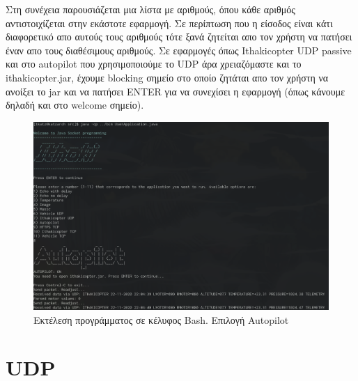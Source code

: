 \documentclass[hidelinks, 12pt, a4paper]{article}
\begin{document}
Στη συνέχεια παρουσιάζεται μια λίστα με αριθμούς, όπου κάθε αριθμός αντιστοιχίζεται στην εκάστοτε εφαρμογή. Σε περίπτωση που η είσοδος είναι κάτι διαφορετικό απο αυτούς τους αριθμούς τότε ξανά ζητείται απο τον χρήστη να πατήσει έναν απο τους διαθέσιμους αριθμούς. Σε εφαρμογές όπως Ithakicopter UDP passive και στο autopilot που χρησιμοποιούμε το UDP άρα χρειαζόμαστε και το ithakicopter.jar, έχουμε blocking σημείο στο οποίο ζητάται απο τον χρήστη να ανοίξει το jar και να πατήσει ENTER για να συνεχίσει η εφαρμογή (όπως κάνουμε δηλαδή και στο welcome σημείο).

\begin{figure}[h!]
\centering
	\includegraphics[height=.3\textheight, width=\textwidth]{assets/ui.png}
	\caption{Εκτέλεση προγράμματος σε κέλυφος Bash. Επιλογή Autopilot} 
    \label{fig:ui}
\end{figure}


\pagebreak

\section{UDP}
\end{document}

